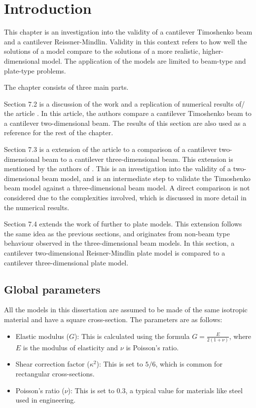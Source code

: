 \documentclass[../../main.tex]{subfiles}
\begin{document}
\section{Introduction}
This chapter is an investigation into the validity of a cantilever Timoshenko beam and a cantilever Reissner-Mindlin. Validity in this context refers to how well the solutions of a model compare to the solutions of a more realistic, higher-dimensional model. The application of the models are limited to beam-type and plate-type problems.

The chapter consists of three main parts.

Section 7.2 is a discussion of the work and a replication of numerical results of/ the article \cite{LVV09}. In this article, the authors compare a cantilever Timoshenko beam to a cantilever two-dimensional beam. The results of this section are also used as a reference for the rest of the chapter.

Section 7.3 is a extension of the article \cite{LVV09} to a comparison of a cantilever two-dimensional beam to a cantilever three-dimensional beam. This extension is mentioned by the authors of \cite{LVV09}. This is an investigation into the validity of a two-dimensional beam model, and is an intermediate step to validate the Timoshenko beam model against a three-dimensional beam model. A direct comparison is not considered due to the complexities involved, which is discussed in more detail in the numerical results.

Section 7.4 extends the work of \cite{LVV09} further to plate models. This extension follows the same idea as the previous sections, and originates from non-beam type behaviour observed in the three-dimensional beam models. In this section, a cantilever two-dimensional Reisner-Mindlin plate model is compared to a cantilever three-dimensional plate model.


\subsection{Global parameters}
All the models in this dissertation are assumed to be made of the same isotropic material and have a square cross-section. The parameters are as follows:

\begin{itemize}
    \item Elastic modulus ($G$): This is calculated using the formula $G = \frac{E}{2(1+\nu)}$, where $E$ is the modulus of elasticity and $\nu$ is Poisson's ratio. 

    \item Shear correction factor ($\kappa^2$): This is set to $5/6$, which is common for rectangular cross-sections.

    \item Poisson's ratio ($\nu$): This is set to $0.3$, a typical value for materials like steel used in engineering.
\end{itemize}
\end{document}
